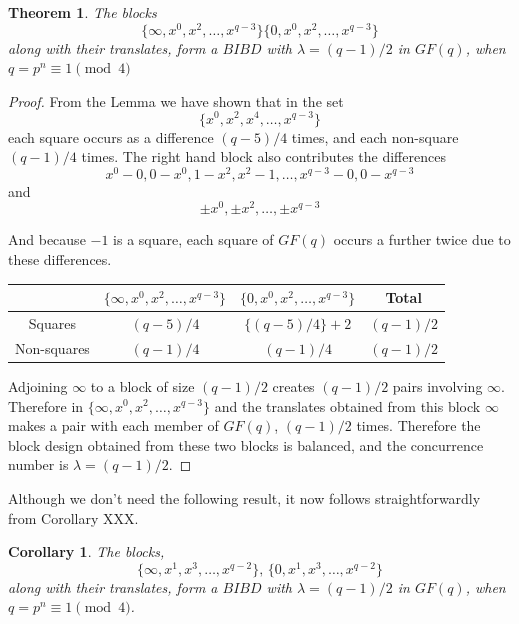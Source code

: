 \documentclass[
  11pt,
  a4paper]{book}\usepackage[]{graphicx}\usepackage[]{xcolor}
\newtheorem{theorem}{Theorem}
\newtheorem{corollary}{Corollary}[theorem]
\begin{document}
\begin{theorem}
The blocks
\begin{equation}
\{\infty, x^0, x^2, \ldots, x^{q - 3}\}\{0, x^0, x^2, \ldots, x^{q - 3}\}
\end{equation}
along with their translates, form a $BIBD$ with
$\lambda = (q - 1)/2$ in $GF(q)$, when
$q = p^n \equiv 1\pmod 4$
\end{theorem}
\begin{proof}
From the Lemma we have shown that in the set
\begin{equation}
\{x^0, x^2, x^4, \ldots, x^{q - 3}\}
\end{equation}
each square occurs as a difference
$(q - 5)/4$ times, and each non-square $(q-1)/4$ times.
The right hand block also contributes the differences
\begin{equation}
x^0 - 0, 0 - x^0, 1 - x^2, x^2 - 1, \ldots, x^{q - 3} - 0, 0 - x^{q - 3}
\end{equation}
and
\begin{equation}
\pm x^0, \pm x^2, \ldots ,\pm x^{q - 3}
\end{equation}

And because $-1$ is a square, each square of $GF(q)$ occurs
a further twice due to these differences.

\begin{center}
\begin{tabular}{c|ccc}
               & $\{\infty, x^0, x^2, \ldots, x^{q - 3}\}$ & $\{0, x^0, x^2, \ldots,x^{q - 3}\}$ &   Total     \\ \hline
     Squares   &               $(q - 5)/4$                 &         $\{(q - 5)/4\} + 2$         & $(q - 1)/2$ \\
   Non-squares &               $(q - 1)/4$                 &              $(q - 1)/4$            & $(q - 1)/2$ \\
\end{tabular}
\end{center}

Adjoining $\infty$ to a block of size $(q - 1)/2$ creates
$(q - 1)/2$ pairs involving $\infty$. Therefore in
$\{\infty, x^0, x^2, \ldots, x^{q - 3}\}$ and the translates
obtained from this block $\infty$ makes a pair with each
member of $GF(q)$, $(q - 1)/2$ times.  Therefore the block
design obtained from these two blocks is balanced, and the
concurrence number is $\lambda = (q - 1)/2$.
\end{proof}

Although we don’t need the following result, it now follows
straightforwardly from Corollary XXX.
\begin{corollary}
The blocks,
\begin{equation}
\{\infty, x^1, x^3, \ldots, x^{q - 2}\},\, \{0, x^1, x^3, \ldots, x^{q - 2}\}
\end{equation}
along with their translates, form a $BIBD$ with
$\lambda = (q - 1)/2$ in $GF(q)$, when
$q = p^n \equiv 1\pmod 4$.
\end{corollary}
\end{document}
